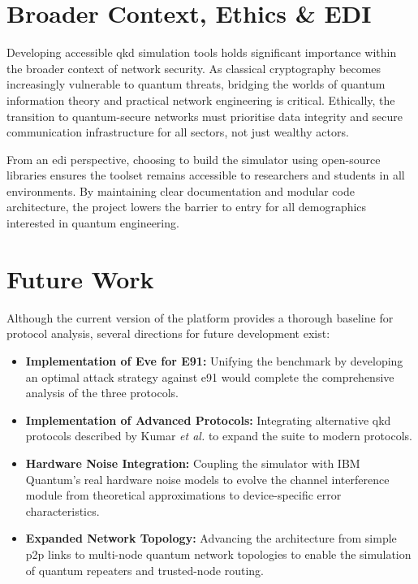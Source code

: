 \section{Broader Context, Ethics \& EDI}
\label{sec:context}

Developing accessible \gls{qkd} simulation tools holds significant importance within the broader context of network security. As classical cryptography becomes increasingly vulnerable to quantum threats, bridging the worlds of quantum information theory and practical network engineering is critical. Ethically, the transition to quantum-secure networks must prioritise data integrity and secure communication infrastructure for all sectors, not just wealthy actors.



From an \gls{edi} perspective, choosing to build the simulator using open-source libraries ensures the toolset remains accessible to researchers and students in all environments. By maintaining clear documentation and modular code architecture, the project lowers the barrier to entry for all demographics interested in quantum engineering.


\section{Future Work}
\label{sec:future}

Although the current version of the platform provides a thorough baseline for protocol analysis, several directions for future development exist:

\begin{itemize}
    \item \textbf{Implementation of Eve for E91:} Unifying the benchmark by developing an optimal attack strategy against \gls{e91} would complete the comprehensive analysis of the three protocols.

    \item \textbf{Implementation of Advanced Protocols:} Integrating alternative \gls{qkd} protocols described by Kumar \textit{et al.} \cite{Kumar2025} to expand the suite to modern protocols.

    \item \textbf{Hardware Noise Integration:} Coupling the simulator with IBM Quantum's real hardware noise models to evolve the channel interference module from theoretical approximations to device-specific error characteristics.

    \item \textbf{Expanded Network Topology:} Advancing the architecture from simple \gls{p2p} links to multi-node quantum network topologies to enable the simulation of quantum repeaters and trusted-node routing.

\end{itemize}